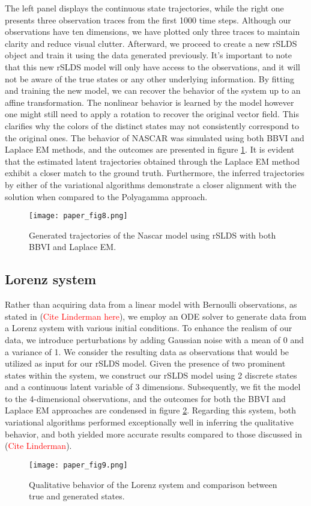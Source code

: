 The left panel displays the continuous state trajectories, while the right one presents three observation traces from the first 1000 time steps. Although our observations have ten dimensions, we have plotted only three traces to maintain clarity and reduce visual clutter. Afterward, we proceed to create a new rSLDS object and train it using the data generated previously. It's important to note that this new rSLDS model will only have access to the observations, and it will not be aware of the true states or any other underlying information. By fitting and training the new model, we can recover the behavior of the system up to an affine transformation. The nonlinear behavior is learned by the model however one might still need to apply a rotation to recover the original vector field. This clarifies why the colors of the distinct states may not consistently correspond to the original ones. The behavior of NASCAR was simulated using both BBVI and Laplace EM methods, and the outcomes are presented in figure \ref{generatedNascar}. It is evident that the estimated latent trajectories obtained through the Laplace EM method exhibit a closer match to the ground truth. Furthermore, the inferred trajectories by either of the variational algorithms demonstrate a closer alignment with the solution when compared to the Polyagamma approach.
\begin{figure}[h!]
	\centering
	\texttt{[image: paper\_fig8.png]}
	\caption{Generated trajectories of the Nascar model using rSLDS with both BBVI and Laplace EM.}
	\label{generatedNascar}
\end{figure}

\subsection{Lorenz system}
Rather than acquiring data from a linear model with Bernoulli observations, as stated in (\textcolor{red}{Cite Linderman here}), we employ an ODE solver to generate data from a Lorenz system with various initial conditions. To enhance the realism of our data, we introduce perturbations by adding Gaussian noise with a mean of 0 and a variance of 1. We consider the resulting data as observations that would be utilized as input for our rSLDS model. Given the presence of two prominent states within the system, we construct our rSLDS model using 2 discrete states and a continuous latent variable of 3 dimensions. Subsequently, we fit the model to the 4-dimensional observations, and the outcomes for both the BBVI and Laplace EM approaches are condensed in figure \ref{lorenz}. Regarding this system, both variational algorithms performed exceptionally well in inferring the qualitative behavior, and both yielded more accurate results compared to those discussed in (\textcolor{red}{Cite Linderman}).
\begin{figure}[h!]
	\centering
	\texttt{[image: paper\_fig9.png]}
	\caption{Qualitative behavior of the Lorenz system and comparison between true and generated states.}
	\label{lorenz}
\end{figure}
